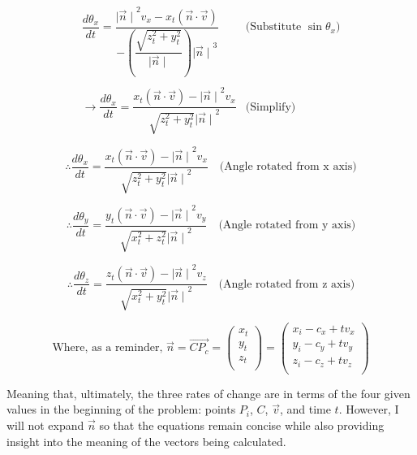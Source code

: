 \documentclass[12pt]{article}
\begin{document}
$$
\begin{array}{l|c}
 \dfrac{d\theta_x}{dt} = \dfrac{{\mid \vec n \mid}^2 v_x - x_t(\vec n \cdot \vec v)}{-(\dfrac{\sqrt{z_t^2 + y_t^2}}{\mid \vec n \mid}) {\mid \vec n \mid}^3} & \text{(Substitute } \sin \theta_x \text{)} \\ \\
 \rightarrow \dfrac{d\theta_x}{dt} = \dfrac{ x_t(\vec n \cdot \vec v) - {\mid \vec n \mid}^2 v_x}{\sqrt{z_t^2 + y_t^2} {\mid \vec n \mid}^2} & \text{(Simplify)} \\ \\
 \end{array} 
$$
\newline
\begin{equation}
    \boxed{\therefore \frac{d\theta_x}{dt} = \frac{x_t(\vec n \cdot \vec v) - {\mid \vec n \mid}^2 v_x}{\sqrt{z_t^2 + y_t^2} {\mid \vec n \mid}^2}}  \quad \text{(Angle rotated from x axis)}
\end{equation}

\begin{equation}
    \boxed{\therefore \frac{d\theta_y}{dt} = \frac{y_t(\vec n \cdot \vec v) - {\mid \vec n \mid}^2 v_y}{\sqrt{x_t^2 + z_t^2} {\mid \vec n \mid}^2}} \quad \text{(Angle rotated from y axis)}
\end{equation}

\begin{equation}
    \boxed{\therefore \frac{d\theta_z}{dt} = \frac{z_t(\vec n \cdot \vec v) - {\mid \vec n \mid}^2 v_z }{\sqrt{x_t^2 + y_t^2} {\mid \vec n \mid}^2}} \quad \text{(Angle rotated from z axis)}
\end{equation}

$$\text{Where, as a reminder, } \vec n = \overrightarrow{CP_c} = \begin{pmatrix} x_t \\ y_t \\ z_t \\ \end{pmatrix} = \begin{pmatrix} x_i-c_x+tv_x \\ y_i-c_y + tv_y \\ z_i-c_z + tv_z \\ \end{pmatrix}$$

Meaning that, ultimately, the three rates of change are in terms of the four given values in the beginning of the problem: points $P_i$, $C$, $\vec v$, and time $t$. However, I will not expand $\vec n$ so that the equations remain concise while also providing insight into the meaning of the vectors being calculated.
\end{document}
